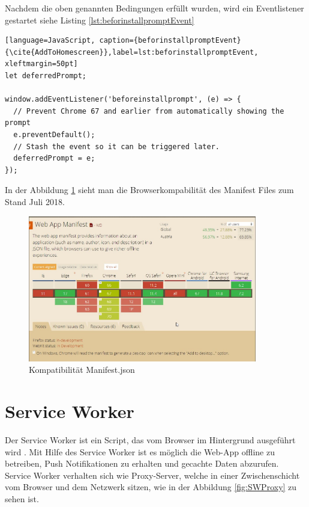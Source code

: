 Nachdem die oben genannten Bedingungen erfüllt wurden, wird ein Eventlistener gestartet siehe Listing \ref{lst:beforinstallpromptEvent}


\begin{lstlisting}[language=JavaScript, caption={beforinstallpromptEvent} {\cite{AddToHomescreen}},label=lst:beforinstallpromptEvent, xleftmargin=50pt]
let deferredPrompt;

window.addEventListener('beforeinstallprompt', (e) => {
  // Prevent Chrome 67 and earlier from automatically showing the prompt
  e.preventDefault();
  // Stash the event so it can be triggered later.
  deferredPrompt = e;
});
\end{lstlisting}

In der Abbildung \ref{fig:BrowserManifest} sieht man die Browserkompabilität des Manifest Files zum Stand Juli 2018.
 
\begin{figure}[H]
	\centering
	\includegraphics[width=10cm]{BilderAllgemein/BrowserManifest}\medskip
	\caption{Kompatibilität Manifest.json \cite{BrowserSupport}}
	\label{fig:BrowserManifest}
\end{figure}
 


\section{Service Worker}\label{sub:ServiceWorker}
Der Service Worker ist ein Script, das vom Browser im Hintergrund ausgeführt wird \cite{ServiceWorkerRegistration}. Mit Hilfe des Service Worker ist es möglich die \acs{Web-App} offline zu betreiben, Push Notifikationen zu erhalten und gecachte Daten abzurufen. Service Worker verhalten sich wie Proxy-Server, welche in einer Zwischenschicht vom Browser und dem Netzwerk sitzen, wie in der Abbildung \ref{fig:SWProxy} zu sehen ist.

